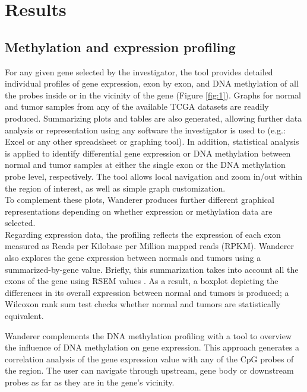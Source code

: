 \documentclass{bmcart}
\begin{document}
\section*{Results}

{\color{red} \subsection*{Methylation and expression profiling}}


For any given gene selected by the investigator, the tool provides detailed individual profiles of gene expression, exon by exon, and DNA methylation of all the probes inside or in the vicinity of the gene (Figure \ref{fig:1}). Graphs for normal and tumor samples from any of the available TCGA datasets are readily produced. Summarizing plots and tables are also generated, allowing further data analysis or representation using any software the investigator is used to (e.g.: Excel or any other spreadsheet or graphing tool). In addition, statistical analysis is applied to identify differential gene expression or DNA methylation between normal and tumor samples at either the single exon or the DNA methylation probe level, respectively. The tool allows local navigation and zoom in/out within the region of interest, as well as simple graph customization.\\

{\color{red} To complement these plots, Wanderer produces further different graphical representations depending on whether expression or methylation data are selected}.\\ 

{\color{red}
Regarding expression data, the profiling reflects the expression of each exon measured as Reads per Kilobase per Million mapped reads (RPKM). Wanderer also explores the gene expression between normals and tumors using a summarized-by-gene value. {\color{red} Briefly, this summarization takes into account all the exons of the gene using RSEM values \cite{guo2013large}}. As a result, a boxplot depicting the differences in its overall expression between normal and tumors is produced; a Wilcoxon rank sum test checks whether normal and tumors are statistically equivalent.\\
}

{\color{red}
Wanderer complements the DNA methylation profiling with a tool to overview the influence of DNA methylation on gene expression. This approach generates a correlation analysis of the gene expression value with any of the CpG probes of the region. The user can navigate through upstream, gene body or downstream probes as far as they are in the gene's vicinity.}\\
\end{document}
